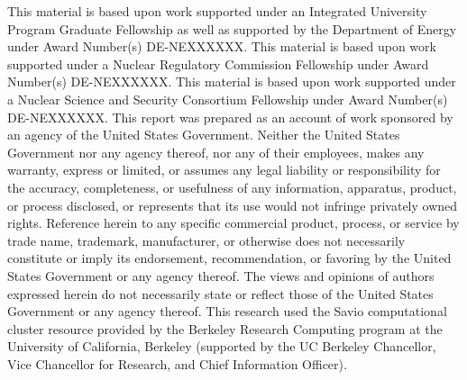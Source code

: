 \documentclass{ucbthesis}
\begin{document}
\begin{frontmatter}


\setcounter{secnumdepth}{3}
\setcounter{tocdepth}{3}


\tableofcontents
\clearpage
\listoffigures
\clearpage
\listoftables

\begin{acknowledgements}
\small

\scriptsize{This material is based upon work supported under an Integrated
University Program Graduate Fellowship as well as supported by the Department 
of Energy under Award Number(s) DE-NEXXXXXX. 
This material is based upon work supported under a Nuclear Regulatory 
Commission Fellowship under Award Number(s) DE-NEXXXXXX. 
This material is based upon work supported under a Nuclear Science and Security 
Consortium Fellowship under Award Number(s) DE-NEXXXXXX. 
This report was prepared as an account  of work sponsored by an agency of the 
United States Government. Neither the United 
States Government nor any agency thereof, nor any of their employees, makes any 
warranty, express or limited, or assumes any legal liability or responsibility for the 
accuracy, completeness, or usefulness of any information, apparatus, product, or
process disclosed, or represents that its use would not infringe privately owned
rights. Reference herein to any specific commercial product, process, or service by
trade name, trademark, manufacturer, or otherwise does not necessarily constitute or
imply its endorsement, recommendation, or favoring by the United States Government or
any agency thereof. The views and opinions of authors expressed herein do not 
necessarily state or reflect those of the United States Government or any agency 
thereof. This research used the Savio computational cluster resource provided by the 
Berkeley Research Computing program at the University of California, Berkeley 
(supported by the UC Berkeley Chancellor, Vice Chancellor for Research, and Chief 
Information Officer).}

\end{acknowledgements}

\end{frontmatter}

\pagestyle{headings}
\end{document}
